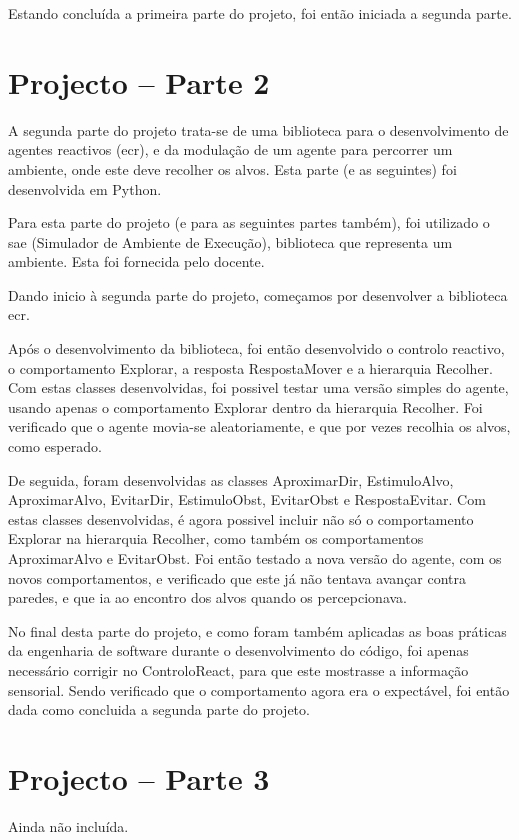 \documentclass[a4paper,12pt]{article}
\begin{document}
Estando concluída a primeira parte do projeto, foi então iniciada a segunda parte.

\newpage
\section{Projecto – Parte 2}
A segunda parte do projeto trata-se de uma biblioteca para o desenvolvimento de agentes reactivos (ecr), e da modulação de um agente para percorrer um ambiente, onde este deve recolher os alvos. Esta parte (e as seguintes) foi desenvolvida em Python.

Para esta parte do projeto (e para as seguintes partes também), foi utilizado o sae (Simulador de Ambiente de Execução), biblioteca que representa um ambiente. Esta foi fornecida pelo docente.

Dando inicio à segunda parte do projeto, começamos por desenvolver a biblioteca ecr.

Após o desenvolvimento da biblioteca, foi então desenvolvido o controlo reactivo, o comportamento Explorar, a resposta RespostaMover e a hierarquia Recolher.
Com estas classes desenvolvidas, foi possivel testar uma versão simples do agente, usando apenas o comportamento Explorar dentro da hierarquia Recolher. Foi verificado que o agente movia-se aleatoriamente, e que por vezes recolhia os alvos, como esperado.

De seguida, foram desenvolvidas as classes AproximarDir, EstimuloAlvo, AproximarAlvo, EvitarDir, EstimuloObst, EvitarObst e RespostaEvitar.
Com estas classes desenvolvidas, é agora possivel incluir não só o comportamento Explorar na hierarquia Recolher, como também os comportamentos AproximarAlvo e EvitarObst. Foi então testado a nova versão do agente, com os novos comportamentos, e verificado que este já não tentava avançar contra paredes, e que ia ao encontro dos alvos quando os percepcionava.

No final desta parte do projeto, e como foram também aplicadas as boas práticas da engenharia de software durante o desenvolvimento do código, foi apenas necessário corrigir no ControloReact, para que este mostrasse a informação sensorial.
Sendo verificado que o comportamento agora era o expectável, foi então dada como concluida a segunda parte do projeto.

\newpage
\section{Projecto – Parte 3}
Ainda não incluída.
\end{document}
